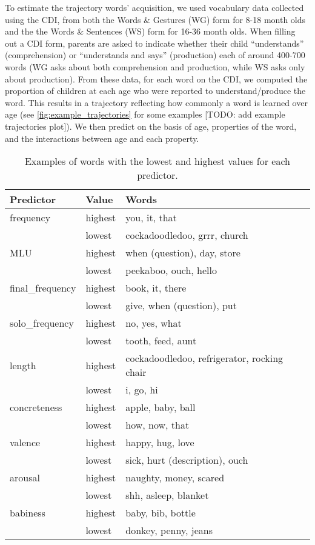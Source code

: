 \documentclass[9pt,twocolumn,twoside]{pnas-new}
\begin{document}
To estimate the trajectory words' acquisition, we used vocabulary data
collected using the CDI, from both the Words \& Gestures (WG) form for
8-18 month olds and the the Words \& Sentences (WS) form for 16-36 month
olds. When filling out a CDI form, parents are asked to indicate whether
their child ``understands'' (comprehension) or ``understands and says''
(production) each of around 400-700 words (WG asks about both
comprehension and production, while WS asks only about production). From
these data, for each word on the CDI, we computed the proportion of
children at each age who were reported to understand/produce the word.
This results in a trajectory reflecting how commonly a word is learned
over age (see \ref{fig:example_trajectories} for some examples {[}TODO:
add example trajectories plot{]}). We then predict on the basis of age,
properties of the word, and the interactions between age and each
property.

\begin{table}[b!]
\centering
\begin{tabular}{lll}
  \hline
Predictor & Value & Words \\ 
  \hline
frequency & highest & you, it, that \\ 
   & lowest & cockadoodledoo, grrr, church \\ 
  MLU & highest & when (question), day, store \\ 
   & lowest & peekaboo, ouch, hello \\ 
  final\_frequency & highest & book, it, there \\ 
   & lowest & give, when (question), put \\ 
  solo\_frequency & highest & no, yes, what \\ 
   & lowest & tooth, feed, aunt \\ 
  length & highest & cockadoodledoo, refrigerator, rocking chair \\ 
   & lowest & i, go, hi \\ 
  concreteness & highest & apple, baby, ball \\ 
   & lowest & how, now, that \\ 
  valence & highest & happy, hug, love \\ 
   & lowest & sick, hurt (description), ouch \\ 
  arousal & highest & naughty, money, scared \\ 
   & lowest & shh, asleep, blanket \\ 
  babiness & highest & baby, bib, bottle \\ 
   & lowest & donkey, penny, jeans \\ 
   \hline
\end{tabular}
\caption{Examples of words with the lowest and highest values for each predictor.} 
\label{table:extremes}
\end{table}
\end{document}
